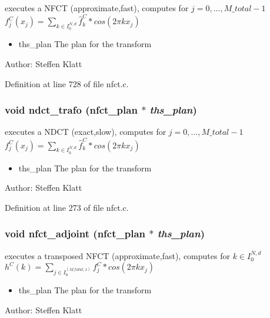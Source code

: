 executes a NFCT (approximate,fast), computes for $j=0,...,M\_total-1$ $f_j^C(x_j) = \sum_{k \in I_0^{N,d}} \hat{f}_k^C * cos(2 \pi k x_j)$ 

\begin{itemize}
\item ths\_\-plan The plan for the transform\end{itemize}
\begin{Desc}
\item[Author:]Steffen Klatt \end{Desc}


Definition at line 728 of file nfct.c.\hypertarget{group__nfsct_ga0ba8106a8051bb76b084543a6196b2c}{
\subsubsection{\setlength{\rightskip}{0pt plus 5cm}void ndct\_\-trafo ({\bf nfct\_\-plan} $\ast$ {\em ths\_\-plan})}}
\label{group__nfsct_ga0ba8106a8051bb76b084543a6196b2c}


executes a NDCT (exact,slow), computes for $j=0,...,M\_total-1$ $f_j^C(x_j) = \sum_{k \in I_0^{N,d}} \hat{f}_k^C * cos(2 \pi k x_j)$ 

\begin{itemize}
\item ths\_\-plan The plan for the transform\end{itemize}
\begin{Desc}
\item[Author:]Steffen Klatt \end{Desc}


Definition at line 273 of file nfct.c.\hypertarget{group__nfsct_gbc14753b2aa4ae8af85fc9632720514e}{
\subsubsection{\setlength{\rightskip}{0pt plus 5cm}void nfct\_\-adjoint ({\bf nfct\_\-plan} $\ast$ {\em ths\_\-plan})}}
\label{group__nfsct_gbc14753b2aa4ae8af85fc9632720514e}


executes a transposed NFCT (approximate,fast), computes for $k \in I_0^{N,d}$ $h^C(k) = \sum_{j \in I_0^{(M\_total,1)}} f_j^C * cos(2 \pi k x_j)$ 

\begin{itemize}
\item ths\_\-plan The plan for the transform\end{itemize}
\begin{Desc}
\item[Author:]Steffen Klatt \end{Desc}


